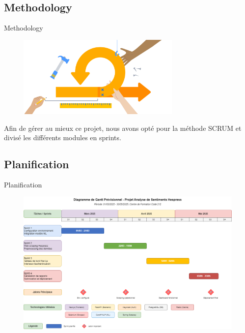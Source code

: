 \subsection{Methodology}
\begin{frame}{Methodology}

    \begin{figure}[H]
        \centering
        \includegraphics[height=4cm]{assets/images/scrum.png}
    \end{figure}

    Afin de gérer au mieux ce projet, nous avons opté pour la méthode SCRUM et divisé les différents modules en sprints.
\end{frame}


\subsection{Planification}
\begin{frame}{Planification}

    \begin{figure}[H]
        \centering
        \includegraphics[scale=0.3]{assets/images/gantt-previsionnel.png}
    \end{figure}
\end{frame}





